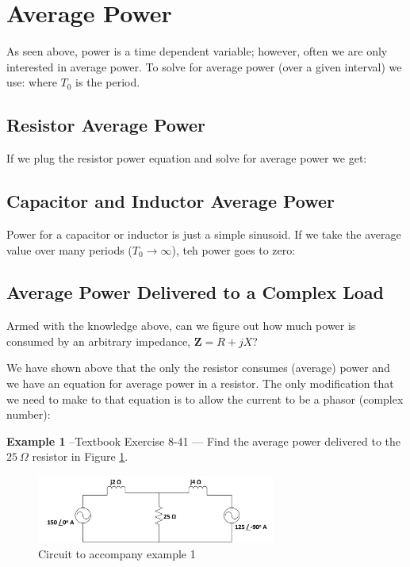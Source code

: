 \documentclass{handout}
\begin{document}
\newpage
\clearpage
\pagebreak

\section{Average Power}
As seen above, power is a time dependent variable; however, often we are only interested in average power.  To solve for average power (over a given interval) we use:
\soln{1in}{
\[
P_{AVE} = \frac{1}{T_0}\int_0^{T_0} p(t) \partial t
\]
}
where $T_0$ is the period.

\subsection{Resistor Average Power}
If we plug the resistor power equation and solve for average power we get:

\subsection{Capacitor and Inductor Average Power}
Power for a capacitor or inductor is just a simple sinusoid.  If we take the average value over many periods ($T_0\rightarrow\infty$), teh power goes to zero:
\soln{1in}{
\[
P_{AVE-C} =0
\]
\[
P_{AVE-L} =0
\]
}

\subsection{Average Power Delivered to a Complex Load}
Armed with the knowledge above, can we figure out how much power is consumed by an arbitrary impedance, $\mathbf{Z} =R +jX$?

We have shown above that the only the resistor consumes (average) power and we have an equation for average power in a resistor.  The only modification that we need to make to that equation is to allow the current to be a phasor (complex number):

\newpage
\clearpage
\pagebreak

\textbf{Example 1} --Textbook Exercise 8-41 --- Find the average power delivered to the $25\ \Omega$ resistor in Figure \ref{fig: Example1}.
\begin{figure} [h!]
\centering
\includegraphics[width=0.7\textwidth]{Example1.jpg}
\caption{Circuit to accompany example 1}
\label{fig: Example1}
\end{figure}
\end{document}
